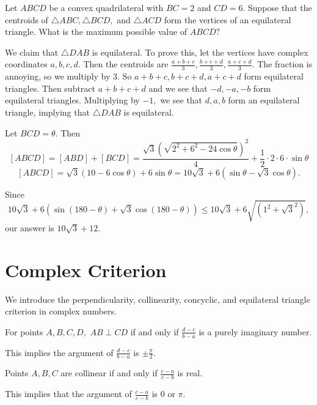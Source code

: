 \documentclass[mast]{lucky}
\begin{document}
\begin{exam}[AMC 12B 2019/25]
Let $ABCD$ be a convex quadrilateral with $BC=2$ and $CD=6.$ Suppose that the centroids of $\triangle ABC,\triangle BCD,$ and $\triangle ACD$ form the vertices of an equilateral triangle. What is the maximum possible value of $ABCD?$
\end{exam}

\begin{sol}
We claim that $\triangle DAB$ is equilateral. To prove this, let the vertices have complex coordinates $a,b,c,d.$ Then the centroids are $\frac{a+b+c}{3},\frac{b+c+d}{3},\frac{a+c+d}{3}.$ The fraction is annoying, so we multiply by $3.$ So $a+b+c,b+c+d,a+c+d$ form equilateral triangles. Then subtract $a+b+c+d$ and we see that $-d,-a,-b$ form equilateral triangles. Multiplying by $-1,$ we see that $d,a,b$ form an equilateral triangle, implying that $\triangle DAB$ is equilateral.

Let $BCD=\theta.$ Then
$$[ABCD]=[ABD]+[BCD]=\frac{\sqrt{3}(\sqrt{2^2+6^2-24\cos\theta})^2}{4}+\frac{1}{2}\cdot 2\cdot 6\cdot \sin \theta$$
$$[ABCD]=\sqrt{3}(10-6\cos\theta)+6\sin\theta=10\sqrt{3}+6(\sin\theta-\sqrt{3}\cos\theta).$$

Since
\[10\sqrt{3}+6(\sin(180-\theta)+\sqrt{3}\cos(180-\theta))\leq 10\sqrt{3}+6\sqrt{(1^2+\sqrt{3}^2)},\]
our answer is $10\sqrt{3}+12.$
\end{sol}

\section{Complex Criterion}
We introduce the perpendicularity, collinearity, concyclic, and equilateral triangle criterion in complex numbers.

\begin{theo}
For points $A,B,C,D,$ $AB\perp CD$ if and only if $\frac{d-c}{b-a}$ is a purely imaginary number.
\end{theo}

\begin{pro}
This implies the argument of $\frac{d-c}{b-a}$ is $\pm \frac{\pi}{2}.$
\end{pro}

\begin{theo}
Points $A,B,C$ are collinear if and only if $\frac{c-a}{c-b}$ is real.
\end{theo}

\begin{pro}
This implies that the argument of $\frac{c-a}{c-b}$ is $0$ or $\pi.$
\end{pro}
\end{document}
